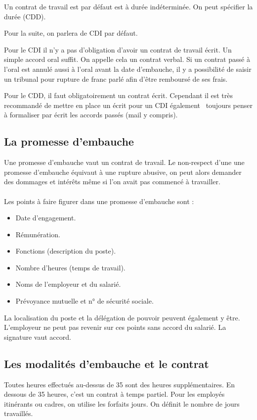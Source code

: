 Un contrat de travail est par défaut est à durée indéterminée.
On peut spécifier la durée (CDD).

Pour la suite, on parlera de CDI par défaut.

Pour le CDI il n’y a pas d’obligation d’avoir un contrat de travail écrit.
Un simple accord oral suffit.
On appelle cela un contrat verbal.
Si un contrat passé à l'oral est annulé aussi à l'oral avant la date d'embauche, il y a possibilité de saisir un tribunal pour rupture de franc parlé afin d'être remboursé de ses frais.

Pour le CDD, il faut obligatoirement un contrat écrit.
Cependant il est très recommandé de mettre en place un écrit pour un CDI également \textrightarrow\ toujours penser à formaliser par écrit les accords passés (mail y compris).


\subsection{La promesse d'embauche}
	Une promesse d’embauche vaut un contrat de travail.
	Le non-respect d’une une promesse d’embauche équivaut à une rupture abusive, on peut alors demander des dommages et intérêts même si l'on avait pas commencé à travailler.

	\paragraph{}
	Les points à faire figurer dans une promesse d’embauche sont :
	\begin{itemize}
		\item[\textbullet] Date d’engagement.
		\item[\textbullet] Rémunération.
		\item[\textbullet] Fonctions (description du poste).
		\item[\textbullet] Nombre d’heures (temps de travail).
		\item[\textbullet] Noms de l'employeur et du salarié.
		\item[\textbullet] Prévoyance mutuelle et n° de sécurité sociale.
	\end{itemize}
	
	La localisation du poste et la délégation de pouvoir peuvent également y être.
	L'employeur ne peut pas revenir sur ces points sans accord du salarié.
	La signature vaut accord.

\subsection{Les modalités d'embauche et le contrat}
	Toutes heures effectués au-dessus de 35 sont des heures supplémentaires.
	En dessous de 35 heures, c’est un contrat à temps partiel.
	Pour les employés itinérants ou cadres, on utilise les forfaits jours.
	On définit le nombre de jours travaillés.

